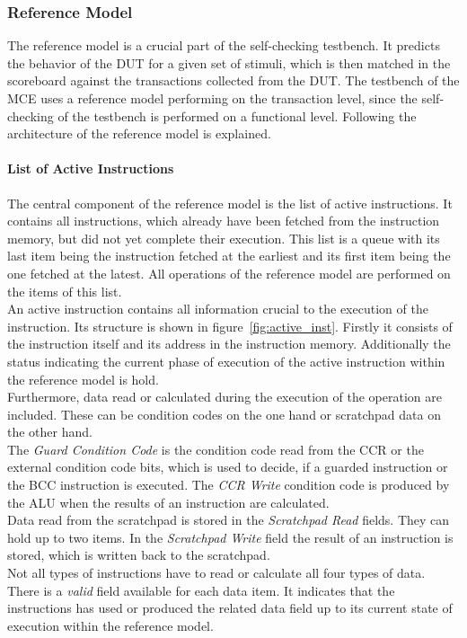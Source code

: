 \subsubsection{Reference Model}

The reference model is a crucial part of the self-checking testbench. 
It predicts the behavior of the DUT for a given set of stimuli, which is then matched in the scoreboard against the transactions collected from the DUT.
The testbench of the MCE uses a reference model performing on the transaction level, since the self-checking of the testbench is performed on a functional level.
Following the architecture of the reference model is explained.

\paragraph{List of Active Instructions}

The central component of the reference model is the list of active instructions.
It contains all instructions, which already have been fetched from the instruction memory, but did not yet complete their execution.
This list is a queue with its last item being the instruction fetched at the earliest and its first item being the one fetched at the latest.
All operations of the reference model are performed on the items of this list.\\
An active instruction contains all information crucial to the execution of the instruction.
Its structure is shown in figure~\ref{fig:active_inst}.
Firstly it consists of the instruction itself and its address in the instruction memory.
Additionally the status indicating the current phase of execution of the active instruction within the reference model is hold.\\
Furthermore, data read or calculated during the execution of the operation are included.
These can be condition codes on the one hand or scratchpad data on the other hand.\\
The \emph{Guard Condition Code} is the condition code read from the CCR or the external condition code bits, which is used to decide, if a guarded instruction
or the BCC instruction is executed.
The \emph{CCR Write} condition code is produced by the ALU when the results of an instruction are calculated.\\
Data read from the scratchpad is stored in the \emph{Scratchpad Read} fields.
They can hold up to two items.
In the \emph{Scratchpad Write} field the result of an instruction is stored, which is written back to the scratchpad.\\
Not all types of instructions have to read or calculate all four types of data.
There is a \emph{valid} field available for each data item.
It indicates that the instructions has used or produced the related data field up to its current state of execution within the reference model.

